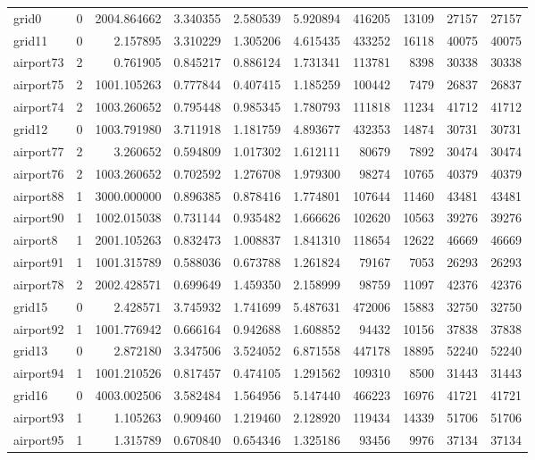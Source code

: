 \documentclass[../../../thesis.tex]{subfiles}
\begin{document}
\begin{longtable}{|l|r|r|r|r|r|r|r|r|r|}
grid0 & 0 & 2004.864662 & 3.340355 & 2.580539 & 5.920894 & 416205 & 13109 & 27157 & 27157 \\
grid11 & 0 & 2.157895 & 3.310229 & 1.305206 & 4.615435 & 433252 & 16118 & 40075 & 40075 \\
airport73 & 2 & 0.761905 & 0.845217 & 0.886124 & 1.731341 & 113781 & 8398 & 30338 & 30338 \\
airport75 & 2 & 1001.105263 & 0.777844 & 0.407415 & 1.185259 & 100442 & 7479 & 26837 & 26837 \\
airport74 & 2 & 1003.260652 & 0.795448 & 0.985345 & 1.780793 & 111818 & 11234 & 41712 & 41712 \\
grid12 & 0 & 1003.791980 & 3.711918 & 1.181759 & 4.893677 & 432353 & 14874 & 30731 & 30731 \\
airport77 & 2 & 3.260652 & 0.594809 & 1.017302 & 1.612111 & 80679 & 7892 & 30474 & 30474 \\
airport76 & 2 & 1003.260652 & 0.702592 & 1.276708 & 1.979300 & 98274 & 10765 & 40379 & 40379 \\
airport88 & 1 & 3000.000000 & 0.896385 & 0.878416 & 1.774801 & 107644 & 11460 & 43481 & 43481 \\
airport90 & 1 & 1002.015038 & 0.731144 & 0.935482 & 1.666626 & 102620 & 10563 & 39276 & 39276 \\
airport8 & 1 & 2001.105263 & 0.832473 & 1.008837 & 1.841310 & 118654 & 12622 & 46669 & 46669 \\
airport91 & 1 & 1001.315789 & 0.588036 & 0.673788 & 1.261824 & 79167 & 7053 & 26293 & 26293 \\
airport78 & 2 & 2002.428571 & 0.699649 & 1.459350 & 2.158999 & 98759 & 11097 & 42376 & 42376 \\
grid15 & 0 & 2.428571 & 3.745932 & 1.741699 & 5.487631 & 472006 & 15883 & 32750 & 32750 \\
airport92 & 1 & 1001.776942 & 0.666164 & 0.942688 & 1.608852 & 94432 & 10156 & 37838 & 37838 \\
grid13 & 0 & 2.872180 & 3.347506 & 3.524052 & 6.871558 & 447178 & 18895 & 52240 & 52240 \\
airport94 & 1 & 1001.210526 & 0.817457 & 0.474105 & 1.291562 & 109310 & 8500 & 31443 & 31443 \\
grid16 & 0 & 4003.002506 & 3.582484 & 1.564956 & 5.147440 & 466223 & 16976 & 41721 & 41721 \\
airport93 & 1 & 1.105263 & 0.909460 & 1.219460 & 2.128920 & 119434 & 14339 & 51706 & 51706 \\
airport95 & 1 & 1.315789 & 0.670840 & 0.654346 & 1.325186 & 93456 & 9976 & 37134 & 37134 \\

\end{longtable}
\end{document}
